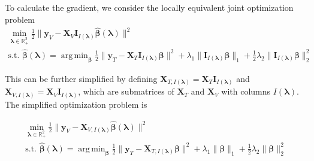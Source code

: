 \documentclass[12pt,letterpaper]{article}
\DeclareMathOperator*{\argmin}{arg\,min}
\begin{document}
To calculate the gradient, we consider the locally equivalent joint optimization problem
\begin{equation}
\begin{array}{c}
\min_{\boldsymbol{\lambda} \in \mathbb{R}^2_{+}} \frac{1}{2} \| \boldsymbol{y}_V - \boldsymbol{X}_V \boldsymbol{I}_{I(\boldsymbol \lambda)} \hat{\boldsymbol{\beta}} (\boldsymbol \lambda) \| ^2 \\
\text{s.t. }
\hat{\boldsymbol{\beta}} (\boldsymbol{\lambda}) = \argmin_{\boldsymbol{\beta}} \frac{1}{2} \| \boldsymbol{y}_T - \boldsymbol{X}_T \boldsymbol{I}_{I(\boldsymbol \lambda)} \boldsymbol{\beta} \| ^2
+ \lambda_1 \| \boldsymbol{I}_{I(\boldsymbol \lambda)} \boldsymbol{\beta} \|_1
+ \frac{1}{2}\lambda_2 \| \boldsymbol{I}_{I(\boldsymbol \lambda)} \boldsymbol{\beta} \|_2^2
\end{array}
\end{equation}

This can be further simplified by defining $\boldsymbol{X}_{T, I(\boldsymbol\lambda)} = \boldsymbol{X}_T \boldsymbol{I}_{I(\boldsymbol \lambda)}$ and $\boldsymbol{X}_{V, I(\boldsymbol\lambda)}  = \boldsymbol{X}_V \boldsymbol{I}_{I(\boldsymbol \lambda)}$, which are submatrices of $\boldsymbol{X}_T$ and $\boldsymbol{X}_V$ with columns $I(\boldsymbol \lambda)$. The simplified optimization problem is

\begin{equation}
\begin{array}{c}
\min_{\boldsymbol{\lambda} \in \mathbb{R}^2_{+}} \frac{1}{2} \| \boldsymbol{y}_V - \boldsymbol{X}_{V, I(\boldsymbol \lambda)} \hat{\boldsymbol{\beta}} (\boldsymbol \lambda) \| ^2 \\
\text{s.t. }
\hat{\boldsymbol{\beta}} (\boldsymbol{\lambda}) = \argmin_{\boldsymbol \beta} \frac{1}{2} \| \boldsymbol{y}_T - \boldsymbol{X}_{T, I(\boldsymbol \lambda)} \boldsymbol \beta \| ^2
+ \lambda_1 \| \boldsymbol \beta \|_1
+ \frac{1}{2}\lambda_2 \| \boldsymbol \beta \|_2^2
\end{array}
\end{equation}
\end{document}
